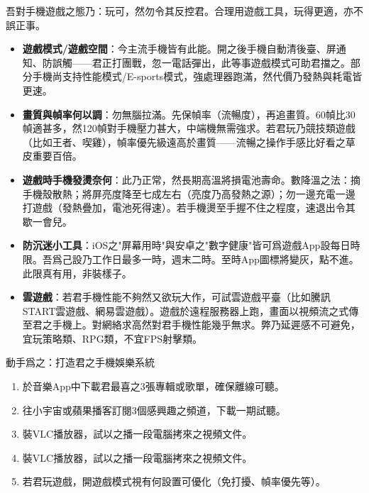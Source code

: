 
吾對手機遊戲之態乃：玩可，然勿令其反控君。合理用遊戲工具，玩得更適，亦不誤正事。

\begin{itemize}
  \item \textbf{遊戲模式/遊戲空間}：今主流手機皆有此能。開之後手機自動清後臺、屏通知、防誤觸——君正打團戰，忽一電話彈出，此等事遊戲模式可助君擋之。部分手機尚支持性能模式/E-sports模式，強處理器跑滿，然代價乃發熱與耗電皆更速。
  \item \textbf{畫質與幀率何以調}：勿無腦拉滿。先保幀率（流暢度），再追畫質。60幀比30幀適甚多，然120幀對手機壓力甚大，中端機無需強求。若君玩乃競技類遊戲（比如王者、喫雞），幀率優先級遠高於畫質——流暢之操作手感比好看之草皮重要百倍。
  \item \textbf{遊戲時手機發燙奈何}：此乃正常，然長期高溫將損電池壽命。數降溫之法：摘手機殼散熱；將屏亮度降至七成左右（亮度乃高發熱之源）；勿一邊充電一邊打遊戲（發熱疊加，電池死得速）。若手機燙至手握不住之程度，速退出令其歇一會兒。
  \item \textbf{防沉迷小工具}：iOS之"屏幕用時"與安卓之"數字健康"皆可爲遊戲App設每日時限。吾爲己設乃工作日最多一時，週末二時。至時App圖標將變灰，點不進。此限真有用，非裝樣子。
  \item \textbf{雲遊戲}：若君手機性能不夠然又欲玩大作，可試雲遊戲平臺（比如騰訊START雲遊戲、網易雲遊戲）。遊戲於遠程服務器上跑，畫面以視頻流之式傳至君之手機上。對網絡求高然對君手機性能幾乎無求。弊乃延遲感不可避免，宜玩策略類、RPG類，不宜FPS射擊類。
\end{itemize}

\begin{tcbpractice}{動手爲之：打造君之手機娛樂系統}
\begin{enumerate}
  \item 於音樂App中下載君最喜之3張專輯或歌單，確保離線可聽。
  \item 往小宇宙或蘋果播客訂閱3個感興趣之頻道，下載一期試聽。
  \item 裝VLC播放器，試以之播一段電腦拷來之視頻文件。
  \item 裝VLC播放器，試以之播一段電腦拷來之視頻文件。
  \item 若君玩遊戲，開遊戲模式視有何設置可優化（免打擾、幀率優先等）。
\end{enumerate}

\end{tcbpractice}
